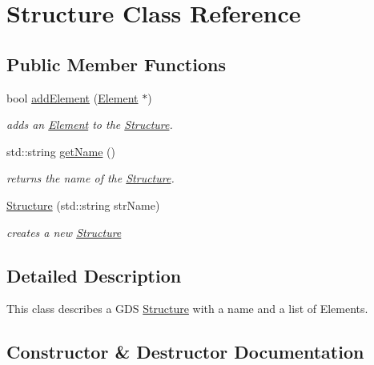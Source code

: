 \hypertarget{class_a_g_d_s_1_1_structure}{}\section{Structure Class Reference}
\label{class_a_g_d_s_1_1_structure}
\subsection*{Public Member Functions}
\begin{DoxyCompactItemize}
\item 
bool \hyperlink{class_a_g_d_s_1_1_structure_a2dd203e6770f7d15d6f706867c919a60}{add\+Element} (\hyperlink{class_a_g_d_s_1_1_element}{Element} $\ast$)
\begin{DoxyCompactList}\small\item\em adds an \hyperlink{class_a_g_d_s_1_1_element}{Element} to the \hyperlink{class_a_g_d_s_1_1_structure}{Structure}. \end{DoxyCompactList}\item 
\mbox{\label{class_a_g_d_s_1_1_structure_ac0fc966d4386ddb71d99361e3fccb311}} 
std\+::string \hyperlink{class_a_g_d_s_1_1_structure_ac0fc966d4386ddb71d99361e3fccb311}{get\+Name} ()
\begin{DoxyCompactList}\small\item\em returns the name of the \hyperlink{class_a_g_d_s_1_1_structure}{Structure}. \end{DoxyCompactList}\item 
\hyperlink{class_a_g_d_s_1_1_structure_a797bfd2e6684bb9870c8070b4ef6ff41}{Structure} (std\+::string str\+Name)
\begin{DoxyCompactList}\small\item\em creates a new \hyperlink{class_a_g_d_s_1_1_structure}{Structure} \end{DoxyCompactList}\end{DoxyCompactItemize}


\subsection{Detailed Description}
This class describes a G\+DS \hyperlink{class_a_g_d_s_1_1_structure}{Structure} with a name and a list of Elements. 

\subsection{Constructor \& Destructor Documentation}
\mbox{\label{class_a_g_d_s_1_1_structure_a797bfd2e6684bb9870c8070b4ef6ff41}} 
